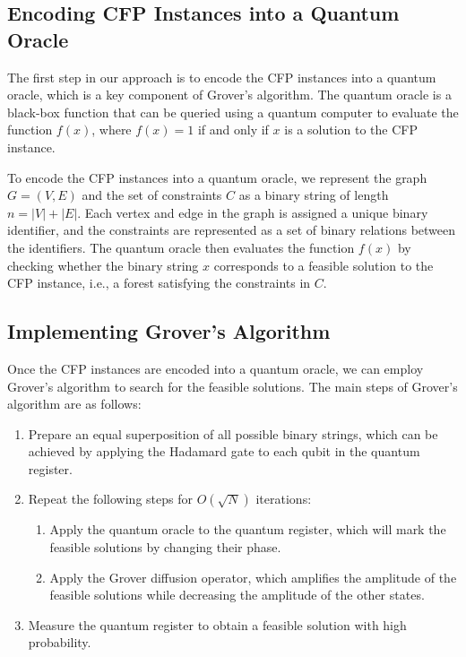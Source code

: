 \subsection{Encoding CFP Instances into a Quantum Oracle}

The first step in our approach is to encode the CFP instances into a quantum oracle, which is a key component of Grover's algorithm. The quantum oracle is a black-box function that can be queried using a quantum computer to evaluate the function $f(x)$, where $f(x) = 1$ if and only if $x$ is a solution to the CFP instance.

To encode the CFP instances into a quantum oracle, we represent the graph $G=(V,E)$ and the set of constraints $C$ as a binary string of length $n = |V| + |E|$. Each vertex and edge in the graph is assigned a unique binary identifier, and the constraints are represented as a set of binary relations between the identifiers. The quantum oracle then evaluates the function $f(x)$ by checking whether the binary string $x$ corresponds to a feasible solution to the CFP instance, i.e., a forest satisfying the constraints in $C$.

\subsection{Implementing Grover's Algorithm}

Once the CFP instances are encoded into a quantum oracle, we can employ Grover's algorithm to search for the feasible solutions. The main steps of Grover's algorithm are as follows:

\begin{enumerate}
    \item Prepare an equal superposition of all possible binary strings, which can be achieved by applying the Hadamard gate to each qubit in the quantum register.
    \item Repeat the following steps for $O(\sqrt{N})$ iterations:
        \begin{enumerate}
            \item Apply the quantum oracle to the quantum register, which will mark the feasible solutions by changing their phase.
            \item Apply the Grover diffusion operator, which amplifies the amplitude of the feasible solutions while decreasing the amplitude of the other states.
        \end{enumerate}
    \item Measure the quantum register to obtain a feasible solution with high probability.
\end{enumerate}

